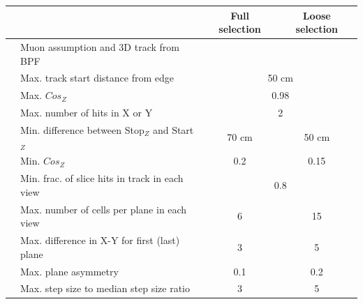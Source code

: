 \documentclass[12pt]{article}
\begin{document}
\begin{table}[!ht]
\centering
\begin{tabular}{clcc}
& \centering{\textbf{Cut}} & \cellcolor[HTML]{3166FF}\textbf{Full selection} & \cellcolor[HTML]{32CB00}\textbf{Loose selection} \\ \hline
                                   & Muon assumption and 3D track from BPF         &                                             &                                          \\
                                   & Max. track start distance from edge                       & \multicolumn{2}{c}{50 cm}                                                                 \\
                                   & Max. $Cos_{Z}$                                            & \multicolumn{2}{c}{0.98}                                                               \\ \hline
                                   & Max. number of hits in X or Y                             & \multicolumn{2}{c}{\cellcolor[HTML]{FFFFFF}2}                                          \\
                                   & Min. difference between Stop$_{Z}$ and Start$_{Z}$        & \cellcolor[HTML]{3166FF}70 cm                 & \cellcolor[HTML]{32CB00}50 cm             \\
                                   & Min. $Cos_{Z}$ & \cellcolor[HTML]{3166FF}0.2                 & \cellcolor[HTML]{32CB00}0.15             \\
                                   & Min. frac. of slice hits in track in each view    & \multicolumn{2}{c}{0.8}                                                                \\
                                   & Max. number of cells per plane in each view               & \cellcolor[HTML]{3166FF}6                   & \cellcolor[HTML]{32CB00}15               \\
                                   & Max. difference in X-Y for first (last) plane     & \cellcolor[HTML]{3166FF}3                   & \cellcolor[HTML]{32CB00}5                \\
                                   & Max. plane asymmetry                                      & \cellcolor[HTML]{3166FF}0.1                 & \cellcolor[HTML]{32CB00}0.2              \\
                                   & Max. step size to median step size ratio                  & \cellcolor[HTML]{3166FF}3                   & \cellcolor[HTML]{32CB00}5                \\

\end{tabular}
\end{table}
\end{document}
